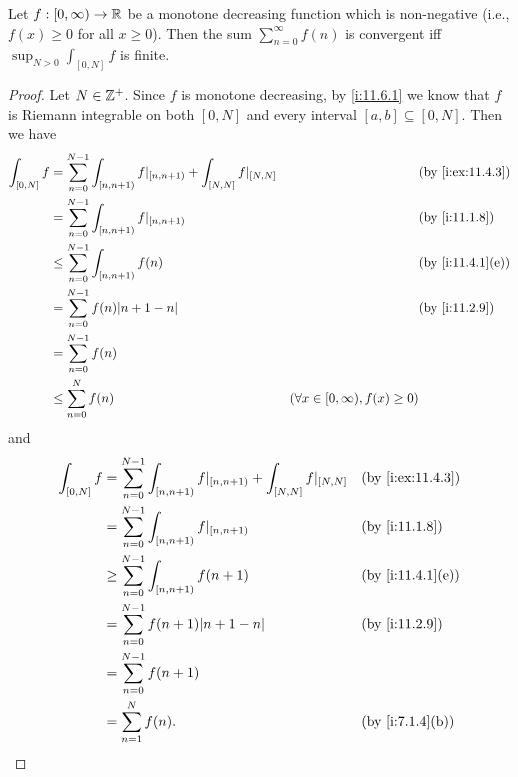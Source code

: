\begin{prop}\label{i:11.6.4}
  Let \(f : [0, \infty) \to \mathbb{R}\) be a monotone decreasing function which is non-negative
  (i.e., \(f(x) \geq 0\) for all \(x \geq 0\)).
  Then the sum \(\sum_{n = 0}^\infty f(n)\) is convergent iff \(\sup_{N > 0} \int_{[0, N]} f\) is finite.
\end{prop}

\begin{proof}
  Let \(N \in \mathbb{Z}^+\).
  Since \(f\) is monotone decreasing, by \cref{i:11.6.1} we know that \(f\) is Riemann integrable on both \([0, N]\) and every interval \([a, b] \subseteq [0, N]\).
  Then we have
  \begin{align*}
    \int_{[0, N]} f & = \sum_{n = 0}^{N - 1} \int_{[n, n + 1)} f|_{[n, n + 1)} + \int_{[N, N]} f|_{[N, N]} &                                          & \by{i:ex:11.4.3} \\
                    & = \sum_{n = 0}^{N - 1} \int_{[n, n + 1)} f|_{[n, n + 1)}                             &                                          & \by{i:11.1.8}    \\
                    & \leq \sum_{n = 0}^{N - 1} \int_{[n, n + 1)} f(n)                                     &                                          & \by{i:11.4.1}[e] \\
                    & = \sum_{n = 0}^{N - 1} f(n) \abs{n + 1 - n}                                          &                                          & \by{i:11.2.9}    \\
                    & = \sum_{n = 0}^{N - 1} f(n)                                                                                                                        \\
                    & \leq \sum_{n = 0}^N f(n)                                                             & (\forall x \in [0, \infty), f(x) \geq 0)
  \end{align*}
  and
  \begin{align*}
    \int_{[0, N]} f & = \sum_{n = 0}^{N - 1} \int_{[n, n + 1)} f|_{[n, n + 1)} + \int_{[N, N]} f|_{[N, N]} &  & \by{i:ex:11.4.3} \\
                    & = \sum_{n = 0}^{N - 1} \int_{[n, n + 1)} f|_{[n, n + 1)}                             &  & \by{i:11.1.8}    \\
                    & \geq \sum_{n = 0}^{N - 1} \int_{[n, n + 1)} f(n + 1)                                 &  & \by{i:11.4.1}[e] \\
                    & = \sum_{n = 0}^{N - 1} f(n + 1) \abs{n + 1 - n}                                      &  & \by{i:11.2.9}    \\
                    & = \sum_{n = 0}^{N - 1} f(n + 1)                                                                            \\
                    & = \sum_{n = 1}^N f(n).                                                               &  & \by{i:7.1.4}[b]
  \end{align*}


\end{proof}
